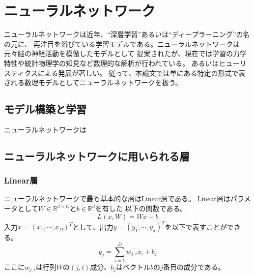

\section{ニューラルネットワーク}
ニューラルネットワークは近年、``深層学習''あるいは``ディープラーニング''の名の元に、
再注目を浴びている学習モデルである。ニューラルネットワークは元々脳の神経活動を模倣したモデルとして
提案されたが、現在では学習の力学特性や統計物理学の知見など数理的な解析が行われている\cite{ディープローカルミニマム,DeepvsShallow}。
あるいはヒューリスティクスによる発展が著しい。
従って、本論文では単にある特定の形式で表される数理モデルとしてニューラルネットワークを扱う。

\subsection{モデル構築と学習}
ニューラルネットワークは

\subsection{ニューラルネットワークに用いられる層}
\subsubsection{Linear層}
ニューラルネットワークで最も基本的な層はLinear層である。
Linear層はパラメータとして\(W \in \mathbb R^{d\times D}\)と\(b \in \mathbb R^d\)を有した
以下の関数である。
\begin{equation}
    L(x,W) = Wx + b
\end{equation}
入力\(x=(x_1,\cdots,x_D)^T\)として、出力\(y=(y_1,\cdots,y_d)^T\)を以下で表すことができる。
\begin{equation}
    y_j = \sum_{i=1}^D  w_{j,i}x_i + b_j 
\end{equation}
ここに\(w_{j,i}\)は行列\(W\)の\((j,i)\)成分、\(b_j\)はベクトル\(b\)の\(j\)番目の成分である。

